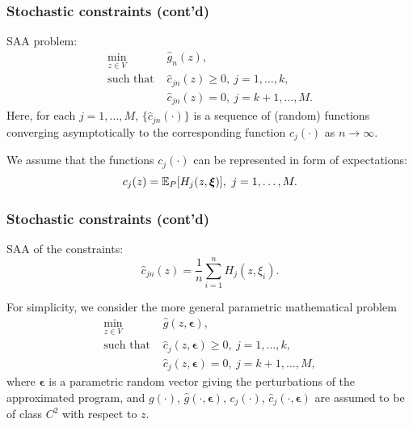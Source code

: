 \documentclass{beamer}
\def\bepsilon{\boldsymbol\epsilon}
\begin{document}
\begin{frame}
\frametitle{Stochastic constraints (cont'd)}

SAA problem:
\begin{align*}
\min_{z \in V}\ & \hat{g}_n(z),\\
\text{such that } & \hat{c}_{jn}(z) \geq 0,\ j = 1,\ldots,k,\\
& \hat{c}_{jn}(z) = 0,\ j = k+1,\ldots, M.
\end{align*}
Here, for each $j = 1,\ldots,M$, $\lbrace \hat{c}_{jn}(\cdot) \rbrace$ is a sequence of (random) functions converging asymptotically to the corresponding function $c_j(\cdot)$ as $n \rightarrow \infty$.

\mbox{}

We assume that the functions $c_j(\cdot)$ can be represented in form of expectations:
\[
c_j(z) = {\mathbb{E}}_P[H_j(z,\boldsymbol{\xi})],\ j = 1,\ldots,M.
\]

\end{frame}

\begin{frame}
\frametitle{Stochastic constraints (cont'd)}

SAA of the constraints:
\[
\hat{c}_{jn}(z) = \frac{1}{n} \sum_{i = 1}^n H_j(z,\xi_i).
\]

\mbox{}

For simplicity, we consider the more general parametric mathematical problem
\begin{align*}
\min_{z \in V}\ & \hat{g}(z, \bepsilon),\\
\text{such that } & \hat{c}_j(z, \bepsilon) \geq 0,\ j
= 1,\ldots,k,\\
& \hat{c}_j(z, \bepsilon) = 0,\ j = k+1,\ldots, M,
\end{align*}
where $\bepsilon$ is a parametric random vector giving the perturbations of the approximated program, and $g(\cdot)$, $\hat{g}(\cdot, \bepsilon)$, $c_j(\cdot)$, $\hat{c}_j(\cdot, \bepsilon)$ are assumed to be of class $C^2$ with respect to $z$.

\end{frame}
\end{document}
